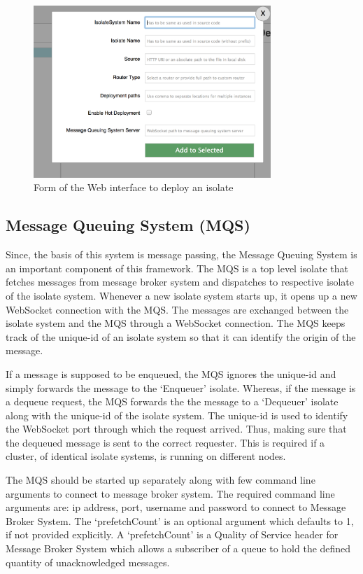 \begin{figure}[H]
  \centering  \includegraphics[width=0.8\textwidth]{figures/webinterface-addisolate}
  \caption[Form of the Web interface to deploy an isolate]{Form of the Web interface to deploy an isolate}
  \label{fig:registryWebInterface-addisolate}
\end{figure}

\subsection{Message Queuing System (MQS)}
\label{subsec:mqs}
  Since, the basis of this system is message passing, the Message Queuing System is an important component of this framework. The MQS is a top level isolate that fetches messages from message broker system and dispatches to respective isolate of the isolate system. Whenever a new isolate system starts up, it opens up a new WebSocket connection with the MQS. The messages are exchanged between the isolate system and the MQS through a WebSocket connection. The MQS keeps track of the unique-id of an isolate system so that it can identify the origin of the message.

  If a message is supposed to be enqueued, the MQS ignores the unique-id and simply forwards the message to the ‘Enqueuer’ isolate. Whereas, if the message is a dequeue request, the MQS forwards the the message to a ‘Dequeuer’ isolate along with the unique-id of the isolate system. The unique-id is used to identify the WebSocket port through which the request arrived. Thus, making sure that the dequeued message is sent to the correct requester. This is required if a cluster, of identical isolate systems, is running on different nodes.

  The MQS should be started up separately along with few command line arguments to connect to message broker system. The required command line arguments are: ip address, port, username and password to connect to Message Broker System. The ‘prefetchCount’ is an optional argument which defaults to 1, if not provided explicitly. A ‘prefetchCount’ is a Quality of Service header for Message Broker System which allows a subscriber of a queue to hold the defined quantity of unacknowledged messages.

